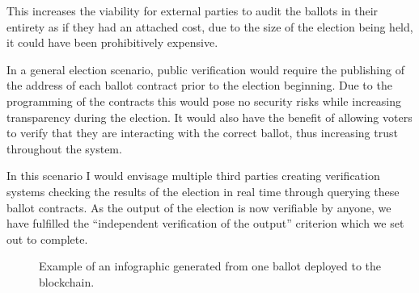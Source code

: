 \documentclass{article}
\begin{document}
This increases the viability for external parties to audit the ballots in their entirety as if they had an attached cost, due to the size of the election being held, it could have been prohibitively expensive. 

In a general election scenario, public verification would require the publishing of the address of each ballot contract prior to the election beginning. Due to the programming of the contracts this would pose no security risks while increasing transparency during the election. It would also have the benefit of allowing voters to verify that they are interacting with the correct ballot, thus increasing trust throughout the system.

In this scenario I would envisage multiple third parties creating verification systems checking the results of the election in real time through querying these ballot contracts. As the output of the election is now verifiable by anyone, we have fulfilled the ``independent verification of the output'' criterion which we set out to complete.

\begin{figure}[h]
	\noindent
	\caption{Example of an infographic generated from one ballot deployed to the blockchain.}
\end{figure}

\cleardoublepage

\end{document}
